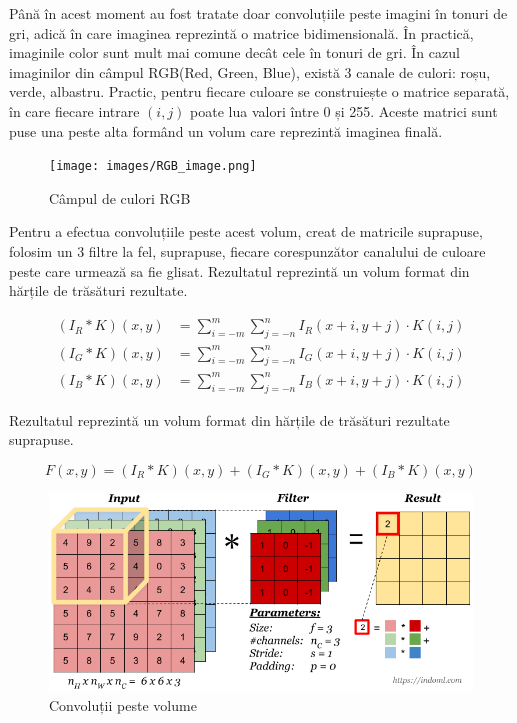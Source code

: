 Până în acest moment au fost tratate doar convoluțiile peste imagini în tonuri de gri, adică în care imaginea reprezintă o matrice bidimensională. În practică, imaginile color sunt mult mai comune decât cele în tonuri de gri. În cazul imaginilor din câmpul RGB(Red, Green, Blue), există 3 canale de culori: roșu, verde, albastru. Practic, pentru fiecare culoare se construiește o matrice separată, în care fiecare intrare $(i,j)$ poate lua valori între 0 și 255. Aceste matrici sunt puse una peste alta formând un volum care reprezintă imaginea finală. 

\begin{figure}[h]
         \centering 
         \texttt{[image: images/RGB\_image.png]}
         \captionsetup{font=footnotesize}
         \caption{Câmpul de culori RGB\cite{rgb}}
\end{figure}



Pentru a efectua convoluțiile peste acest volum, creat de matricile suprapuse, folosim un 3 filtre la fel, suprapuse, fiecare corespunzător canalului de culoare peste care urmează sa fie glisat. Rezultatul reprezintă un volum format din hărțile de trăsături rezultate. 

\begin{equation}
    \begin{aligned}
    (I_R * K)(x, y) &= \sum_{i=-m}^{m} \sum_{j=-n}^{n} I_R(x+i, y+j) \cdot K(i, j) \\
    (I_G * K)(x, y) &= \sum_{i=-m}^{m} \sum_{j=-n}^{n} I_G(x+i, y+j) \cdot K(i, j) \\
    (I_B * K)(x, y) &= \sum_{i=-m}^{m} \sum_{j=-n}^{n} I_B(x+i, y+j) \cdot K(i, j)
    \end{aligned}
    \label{eq: rgb_conv}
\end{equation}

Rezultatul reprezintă un volum format din hărțile de trăsături rezultate suprapuse. 

\begin{equation}
    F(x, y) = (I_R * K)(x, y) + (I_G * K)(x, y) + (I_B * K)(x, y)
\end{equation}

\begin{figure}[h]
         \centering 
         \includegraphics[width=0.75\linewidth]{images/convolutie_rgb.png}
         \captionsetup{font=footnotesize}
         \caption{Convoluții peste volume\cite{conv_rgb}}
\end{figure}

